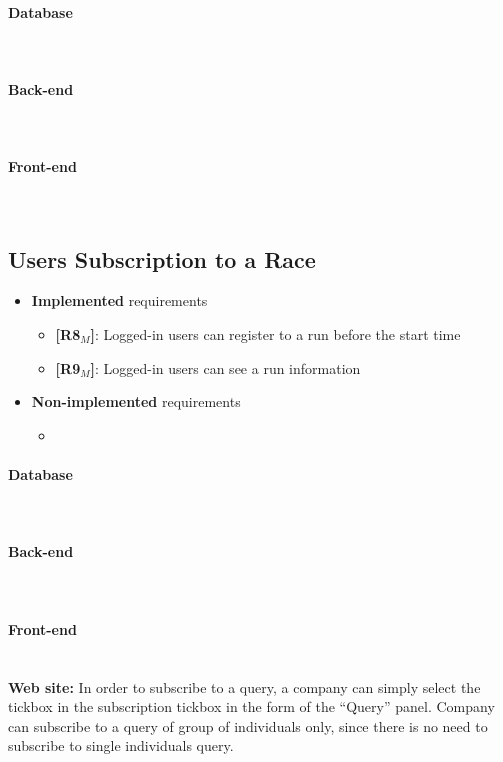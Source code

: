 \paragraph{Database} \mbox{}\\  \paragraph{Back-end} \mbox{}\\  \paragraph{Front-end} \mbox{}\\


\subsection{Users Subscription to a Race}
\begin{itemize}
    \item \textbf{Implemented} requirements
        \begin{itemize}
    \item \textbf{[R8$_M$]}: Logged-in users can register to a run before the start time
    \item \textbf{[R9$_M$]}: Logged-in users can see a run information

        \end{itemize}
    \item \textbf{Non-implemented} requirements
    \begin{itemize}
            \item 
        \end{itemize}
\end{itemize}

\paragraph{Database} \mbox{}\\  
\paragraph{Back-end} \mbox{}\\  
\paragraph{Front-end} \mbox{}\\
\textbf{Web site:} In order to subscribe to a query, a company can simply select the tickbox in the subscription tickbox in the form of the “Query” panel.
Company can subscribe to a query of group of individuals only, since there is no need to subscribe to single individuals query. 


